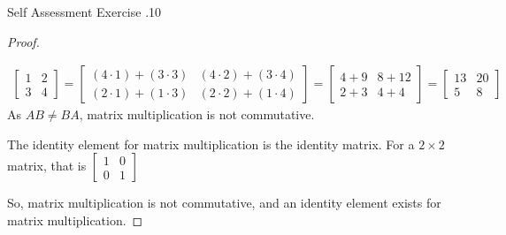 \documentclass[\main/notes.tex]{subfiles}
\begin{document}
\begin{exercise}{Self Assessment Exercise \thechapter.10}
\begin{questions}
\begin{answer}
\begin{proof}
\begin{subproof}
\begin{align*}
\begin{bmatrix}
												1 & 2 \\ 3 & 4
											\end{bmatrix} = \begin{bmatrix}
												(4 \cdot 1) + (3 \cdot 3) & (4 \cdot 2) + (3 \cdot 4)\\
												(2 \cdot 1) + (1 \cdot 3) & (2 \cdot 2) + (1 \cdot 4)
											\end{bmatrix} = \begin{bmatrix}
												4 + 9 & 8 + 12\\
												2 + 3 & 4 + 4
											\end{bmatrix} = \begin{bmatrix}
												13 & 20\\
												5 & 8
											\end{bmatrix}
										\end{align*}
										As $AB \neq BA$, matrix multiplication is not commutative.
									\end{subproof}
									\begin{subproof}[Identity]
										The identity element for matrix multiplication is the identity matrix. For a $2 \times 2$ matrix, that is $\begin{bmatrix}1 & 0 \\ 0 & 1\end{bmatrix}$
									\end{subproof}
									So, matrix multiplication is not commutative, and an identity element exists for matrix multiplication.
								\end{proof}
							\end{answer}
					\end{questions}
				\end{exercise}
\end{document}
